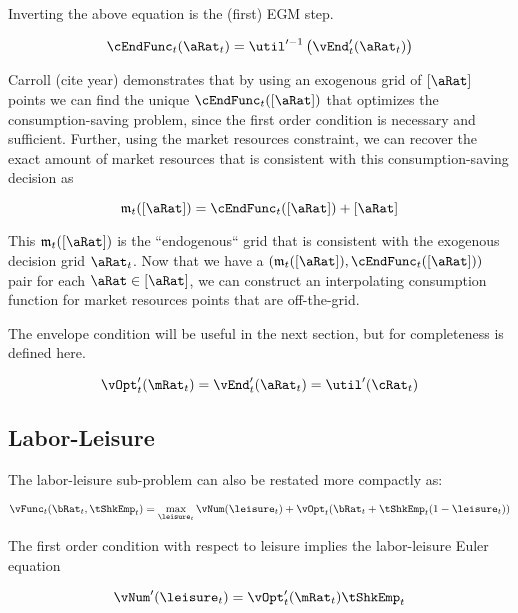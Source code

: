\documentclass[\econtexRoot/EGMN]{subfiles}
\begin{document}
Inverting the above equation is the (first) EGM step.

\begin{equation}
    \cEndFunc_{t}(\aRat_{t}) = \util'^{-1}\left( \vEnd_{t}'(\aRat_{t})
    \right)
\end{equation}

Carroll (cite year) demonstrates that by using an exogenous grid of $[\aRat]$ points we can find the unique
$\cEndFunc_{t}([\aRat])$ that optimizes the consumption-saving problem, since the first order condition is necessary and sufficient.
Further, using the market resources constraint, we can recover the exact amount
of market resources that is consistent with this consumption-saving decision as

\providecommand{\mEndFunc}{\ensuremath{\mathfrak{m}}}

\begin{equation}
    \mEndFunc_{t}([\aRat]) = \cEndFunc_{t}([\aRat]) + [\aRat]
\end{equation}

This $\mEndFunc_{t}([\aRat])$ is the ``endogenous`` grid that is consistent
with the exogenous decision grid $\aRat_{t}$. Now that we have a
$(\mEndFunc_{t}([\aRat]), \cEndFunc_{t}([\aRat]))$ pair for each
$\aRat \in [\aRat]$, we can construct an interpolating consumption function for
market resources points that are off-the-grid.

The envelope condition will be useful in the next section, but for completeness
is defined here.

\begin{equation}
    \vOpt_{t}'(\mRat_{t}) = \vEnd_{t}'(\aRat_{t}) = \util'(\cRat_{t})
\end{equation}

\subsection{Labor-Leisure}

The labor-leisure sub-problem can also be restated more compactly as:

\begin{equation}
    \vFunc_{t}(\bRat_{t}, \tShkEmp_{t}) = \max_{ \leisure_{t}}
    \vNum(\leisure_{t}) + \vOpt_{t}(\bRat_{t} +
    \tShkEmp_{t}(1-\leisure_{t}))
\end{equation}

The first order condition with respect to leisure implies the labor-leisure Euler equation

\begin{equation}
    \vNum'(\leisure_{t}) =	\vOpt_{t}'(\mRat_{t}) \tShkEmp_{t}
\end{equation}
\end{document}
